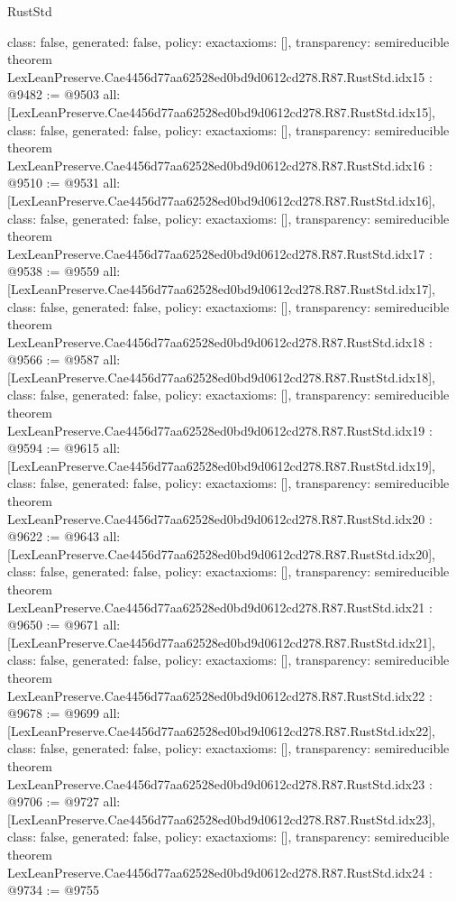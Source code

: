 \begin{lexlean}{RustStd}
\begin{coremodule}
{  class: false,
  generated: false,
  policy: exact{axioms: []},
  transparency: semireducible
}
theorem LexLeanPreserve.Cae4456d77aa62528ed0bd9d0612cd278.R87.RustStd.idx15 : @9482 := @9503 {
  all: [LexLeanPreserve.Cae4456d77aa62528ed0bd9d0612cd278.R87.RustStd.idx15],
  class: false,
  generated: false,
  policy: exact{axioms: []},
  transparency: semireducible
}
theorem LexLeanPreserve.Cae4456d77aa62528ed0bd9d0612cd278.R87.RustStd.idx16 : @9510 := @9531 {
  all: [LexLeanPreserve.Cae4456d77aa62528ed0bd9d0612cd278.R87.RustStd.idx16],
  class: false,
  generated: false,
  policy: exact{axioms: []},
  transparency: semireducible
}
theorem LexLeanPreserve.Cae4456d77aa62528ed0bd9d0612cd278.R87.RustStd.idx17 : @9538 := @9559 {
  all: [LexLeanPreserve.Cae4456d77aa62528ed0bd9d0612cd278.R87.RustStd.idx17],
  class: false,
  generated: false,
  policy: exact{axioms: []},
  transparency: semireducible
}
theorem LexLeanPreserve.Cae4456d77aa62528ed0bd9d0612cd278.R87.RustStd.idx18 : @9566 := @9587 {
  all: [LexLeanPreserve.Cae4456d77aa62528ed0bd9d0612cd278.R87.RustStd.idx18],
  class: false,
  generated: false,
  policy: exact{axioms: []},
  transparency: semireducible
}
theorem LexLeanPreserve.Cae4456d77aa62528ed0bd9d0612cd278.R87.RustStd.idx19 : @9594 := @9615 {
  all: [LexLeanPreserve.Cae4456d77aa62528ed0bd9d0612cd278.R87.RustStd.idx19],
  class: false,
  generated: false,
  policy: exact{axioms: []},
  transparency: semireducible
}
theorem LexLeanPreserve.Cae4456d77aa62528ed0bd9d0612cd278.R87.RustStd.idx20 : @9622 := @9643 {
  all: [LexLeanPreserve.Cae4456d77aa62528ed0bd9d0612cd278.R87.RustStd.idx20],
  class: false,
  generated: false,
  policy: exact{axioms: []},
  transparency: semireducible
}
theorem LexLeanPreserve.Cae4456d77aa62528ed0bd9d0612cd278.R87.RustStd.idx21 : @9650 := @9671 {
  all: [LexLeanPreserve.Cae4456d77aa62528ed0bd9d0612cd278.R87.RustStd.idx21],
  class: false,
  generated: false,
  policy: exact{axioms: []},
  transparency: semireducible
}
theorem LexLeanPreserve.Cae4456d77aa62528ed0bd9d0612cd278.R87.RustStd.idx22 : @9678 := @9699 {
  all: [LexLeanPreserve.Cae4456d77aa62528ed0bd9d0612cd278.R87.RustStd.idx22],
  class: false,
  generated: false,
  policy: exact{axioms: []},
  transparency: semireducible
}
theorem LexLeanPreserve.Cae4456d77aa62528ed0bd9d0612cd278.R87.RustStd.idx23 : @9706 := @9727 {
  all: [LexLeanPreserve.Cae4456d77aa62528ed0bd9d0612cd278.R87.RustStd.idx23],
  class: false,
  generated: false,
  policy: exact{axioms: []},
  transparency: semireducible
}
theorem LexLeanPreserve.Cae4456d77aa62528ed0bd9d0612cd278.R87.RustStd.idx24 : @9734 := @9755 {
}
\end{coremodule}
\end{lexlean}
